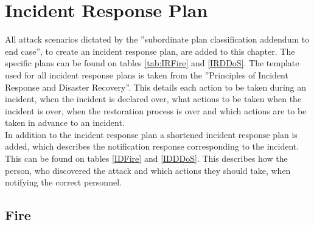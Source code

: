 \section{Incident Response Plan}

All attack scenarios dictated by the ”subordinate plan classification addendum to end case”, to create an incident response plan, are added to this chapter. The specific plans can be found on tables \ref{tab:IRFire} and \ref{IRDDoS}. The template used for all incident response plans is taken from the ”Principles of Incident Response and Disaster Recovery”. This details each action to be taken during an incident, when the incident is declared over, what actions to be taken when the incident is over, when the restoration process is over and which actions are to be taken in advance to an incident.\\
In addition to the incident response plan a shortened incident response plan is added, which describes the notification response corresponding to the incident. This can be found on tables \ref{IDFire} and \ref{IDDDoS}. This describes how the person, who discovered the attack and which actions they should take, when notifying the correct personnel.

\subsection{Fire}

